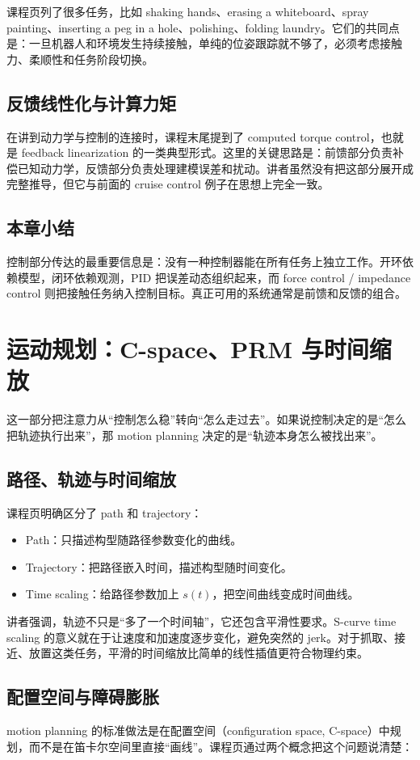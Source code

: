 \documentclass[a4paper]{article}
\begin{document}
课程页列了很多任务，比如 shaking hands、erasing a whiteboard、spray painting、inserting a peg in a hole、polishing、folding laundry。它们的共同点是：一旦机器人和环境发生持续接触，单纯的位姿跟踪就不够了，必须考虑接触力、柔顺性和任务阶段切换。

\subsection{反馈线性化与计算力矩}
在讲到动力学与控制的连接时，课程末尾提到了 computed torque control，也就是 feedback linearization 的一类典型形式。这里的关键思路是：前馈部分负责补偿已知动力学，反馈部分负责处理建模误差和扰动。讲者虽然没有把这部分展开成完整推导，但它与前面的 cruise control 例子在思想上完全一致。

\subsection{本章小结}
控制部分传达的最重要信息是：没有一种控制器能在所有任务上独立工作。开环依赖模型，闭环依赖观测，PID 把误差动态组织起来，而 force control / impedance control 则把接触任务纳入控制目标。真正可用的系统通常是前馈和反馈的组合。

\section{运动规划：C-space、PRM 与时间缩放}
这一部分把注意力从“控制怎么稳”转向“怎么走过去”。如果说控制决定的是“怎么把轨迹执行出来”，那 motion planning 决定的是“轨迹本身怎么被找出来”。

\subsection{路径、轨迹与时间缩放}
课程页明确区分了 path 和 trajectory：

\begin{itemize}
  \item Path：只描述构型随路径参数变化的曲线。
  \item Trajectory：把路径嵌入时间，描述构型随时间变化。
  \item Time scaling：给路径参数加上 \(s(t)\)，把空间曲线变成时间曲线。
\end{itemize}

讲者强调，轨迹不只是“多了一个时间轴”，它还包含平滑性要求。S-curve time scaling 的意义就在于让速度和加速度逐步变化，避免突然的 jerk。对于抓取、接近、放置这类任务，平滑的时间缩放比简单的线性插值更符合物理约束。

\subsection{配置空间与障碍膨胀}
motion planning 的标准做法是在配置空间（configuration space, C-space）中规划，而不是在笛卡尔空间里直接“画线”。课程页通过两个概念把这个问题说清楚：
\end{document}
